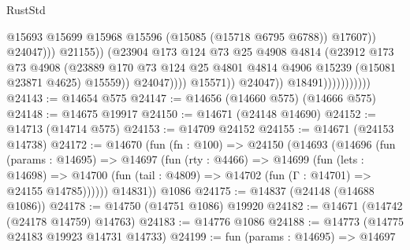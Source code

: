 \begin{lexlean}{RustStd}
\begin{coremodule}
                                                      @15693
                                                      @15699
                                                      @15968
                                                      @15596
                                                      (@15085 (@15718 @6795 @6788))
                                                      @17607))
                                                  @24047)))
                                            @21155))
                                        (@23904
                                          @173
                                          @124
                                          @73
                                          @25
                                          @4908
                                          @4814
                                          (@23912
                                            @173
                                            @73
                                            @4908
                                            (@23889
                                              @170
                                              @73
                                              @124
                                              @25
                                              @4801
                                              @4814
                                              @4906
                                              @15239
                                              (@15081 @23871 @4625)
                                              @15559))
                                          @24047))))
                                  @15571))
                              @24047))
                          @18491)))))))))))
@24143 := @14654 @575
@24147 := @14656 (@14660 @575) (@14666 @575)
@24148 := @14675 @19917
@24150 := @14671 (@24148 @14690)
@24152 := @14713 (@14714 @575)
@24153 := @14709 @24152
@24155 := @14671 (@24153 @14738)
@24172 := @14670
    (fun (fn : @100) =>
    @24150
      (@14693
        (@14696
          (fun (params : @14695) =>
          @14697
            (fun (rty : @4466) =>
            @14699
              (fun (lets : @14698) =>
              @14700 (fun (tail : @4809) => @14702 (fun (Γ : @14701) => @24155 @14785))))))
        @14831))
    @1086
@24175 := @14837 (@24148 (@14688 @1086))
@24178 := @14750 (@14751 @1086) @19920
@24182 := @14671 (@14742 (@24178 @14759) @14763)
@24183 := @14776 @1086
@24188 := @14773 (@14775 @24183 @19923 @14731 @14733)
@24199 := fun (params : @14695) =>
  @14697

\end{coremodule}
\end{lexlean}

